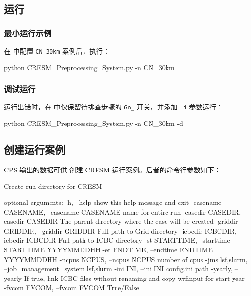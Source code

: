 \documentclass[UTF8,a4paper,11pt,fontset=none]{ctexart}
\begin{document}
\subsection{运行}

\subsubsection{最小运行示例}

在  中配置 \texttt{CN\_30km} 案例后，执行：

\begin{CPSCode}[leftmargin=2em,commandchars=\\\{\}]
    python CRESM_Preprocessing_System.py -n CN_30km
\end{CPSCode}

\subsubsection{调试运行}

运行出错时，在  中仅保留待排查步骤的 \texttt{Go\_} 开关，并添加 \texttt{-d} 参数运行：

\begin{CPSCode}[leftmargin=2em,commandchars=\\\{\}]
    python CRESM_Preprocessing_System.py -n CN_30km -d
\end{CPSCode}

\subsection{创建运行案例}

CPS 输出的数据可供 创建 CRESM 运行案例。后者的命令行参数如下：

\begin{CPSCode}[leftmargin=2em,commandchars=\\\{\}]
    Create run directory for CRESM

    optional arguments:
      -h, --help            show this help message and exit
      -casename CASENAME, --casename CASENAME
                            name for entire run
      -casedir CASEDIR, --casedir CASEDIR
                            The parent directory where the case will be created
      -griddir GRIDDIR, --griddir GRIDDIR
                            Full path to Grid directory
      -icbcdir ICBCDIR, --icbcdir ICBCDIR
                            Full path to ICBC directory
      -st STARTTIME, --starttime STARTTIME
                            YYYYMMDDHH
      -et ENDTIME, --endtime ENDTIME
                            YYYYMMDDHH
      -ncpus NCPUS, --ncpus NCPUS
                            number of cpus
      -jms {lsf,slurm}, --job_management_system {lsf,slurm}
      -ini INI, --ini INI   config.ini path
      -yearly, --yearly     If true, link ICBC files without renaming
                            and copy wrfinput for start year
      -fvcom FVCOM, --fvcom FVCOM
                            True/False
\end{CPSCode}
\end{document}

